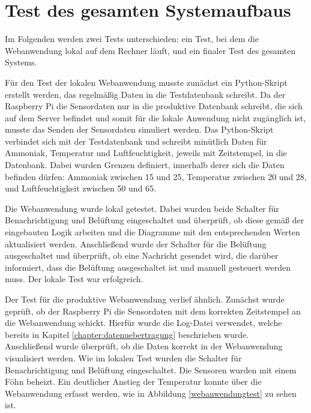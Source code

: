 \documentclass[conference]{IEEEtran}
\begin{document}
\section{Test des gesamten Systemaufbaus}
Im Folgenden werden zwei Tests unterschieden: ein Test, bei dem die Webanwendung lokal auf dem Rechner läuft, und ein finaler Test des gesamten Systems.

Für den Test der lokalen Webanwendung musste zunächst ein Python-Skript erstellt werden, das regelmäßig Daten in die Testdatenbank schreibt. Da der Raspberry Pi die Sensordaten nur in die produktive Datenbank schreibt, die sich auf dem Server befindet und somit für die lokale Anwendung nicht zugänglich ist, musste das Senden der Sensordaten simuliert werden. Das Python-Skript verbindet sich mit der Testdatenbank und schreibt minütlich Daten für Ammoniak, Temperatur und Luftfeuchtigkeit, jeweils mit Zeitstempel, in die Datenbank. Dabei wurden Grenzen definiert, innerhalb derer sich die Daten befinden dürfen: Ammoniak zwischen 15 und 25, Temperatur zwischen 20 und 28, und Luftfeuchtigkeit zwischen 50 und 65.

Die Webanwendung wurde lokal getestet. Dabei wurden beide Schalter für Benachrichtigung und Belüftung eingeschaltet und überprüft, ob diese gemäß der eingebauten Logik arbeiten und die Diagramme mit den entsprechenden Werten aktualisiert werden. Anschließend wurde der Schalter für die Belüftung ausgeschaltet und überprüft, ob eine Nachricht gesendet wird, die darüber informiert, dass die Belüftung ausgeschaltet ist und manuell gesteuert werden muss. Der lokale Test war erfolgreich.

Der Test für die produktive Webanwendung verlief ähnlich. Zunächst wurde geprüft, ob der Raspberry Pi die Sensordaten mit dem korrekten Zeitstempel an die Webanwendung schickt. Hierfür wurde die Log-Datei verwendet, welche bereits in Kapitel \ref{chapter:datenuebertragung}
beschrieben wurde. \\
Anschließend wurde überprüft, ob die Daten korrekt in der Webanwendung visualisiert werden. Wie im lokalen Test wurden die Schalter für Benachrichtigung und Belüftung eingeschaltet. Die Sensoren wurden mit einem Föhn beheizt. Ein deutlicher Anstieg der Temperatur konnte über die Webanwendung erfasst werden, wie in Abbildung \ref{webanwendungtest} zu sehen ist. 
\end{document}
